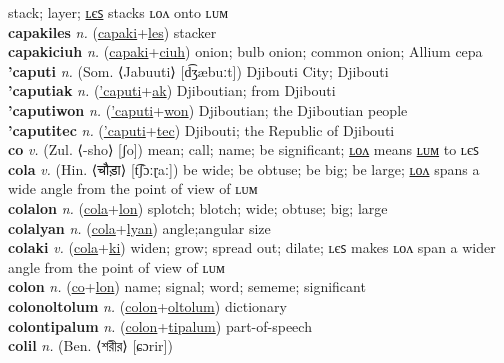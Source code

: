 stack; layer; \hyperref[capakiles]{ʟєꜱ} stacks ʟᴏᴧ onto ʟᴜᴍ \label{capaki} \\
\textbf{capakiles} \textit{n.} (\hyperref[capaki]{capaki}+\hyperref[les]{les})
stacker \label{capakiles} \\
\textbf{capakiciuh} \textit{n.} (\hyperref[capaki]{capaki}+\hyperref[ciuh]{ciuh})
onion; bulb onion; common onion; Allium cepa \label{capakiciuh} \\
\textbf{'caputi} \textit{n.} (Som. ⟨Jabuuti⟩ [d͡ʒæbuːt])
Djibouti City; Djibouti \label{'caputi} \\
\textbf{'caputiak} \textit{n.} (\hyperref['caputi]{'caputi}+\hyperref[ak]{ak})
Djiboutian; from Djibouti \label{'caputiak} \\
\textbf{'caputiwon} \textit{n.} (\hyperref['caputi]{'caputi}+\hyperref[won]{won})
Djiboutian; the Djiboutian people \label{'caputiwon} \\
\textbf{'caputitec} \textit{n.} (\hyperref['caputi]{'caputi}+\hyperref[tec]{tec})
Djibouti; the Republic of Djibouti \label{'caputitec} \\
\textbf{co} \textit{v.} (Zul. ⟨-sho⟩ [ʃo])
mean; call; name; be significant; \hyperref[colon]{ʟᴏᴧ} means \hyperref[colum]{ʟᴜᴍ} to ʟєꜱ \label{co} \\
\textbf{cola} \textit{v.} (Hin. ⟨चौड़ा⟩ [t͡ʃɔːɽaː])
be wide; be obtuse; be big; be large; \hyperref[colalon]{ʟᴏᴧ} spans a wide angle from the point of view of ʟᴜᴍ \label{cola} \\
\textbf{colalon} \textit{n.} (\hyperref[cola]{cola}+\hyperref[lon]{lon})
splotch; blotch; wide; obtuse; big; large \label{colalon} \\
\textbf{colalyan} \textit{n.} (\hyperref[cola]{cola}+\hyperref[lyan]{lyan})
angle;angular size \label{colalyan} \\
\textbf{colaki} \textit{v.} (\hyperref[cola]{cola}+\hyperref[ki]{ki})
widen; grow; spread out; dilate; ʟєꜱ makes ʟᴏᴧ span a wider angle from the point of view of ʟᴜᴍ \label{colaki} \\
\textbf{colon} \textit{n.} (\hyperref[co]{co}+\hyperref[lon]{lon})
name; signal; word; sememe; significant \label{colon} \\
\textbf{colonoltolum} \textit{n.} (\hyperref[colon]{colon}+\hyperref[oltolum]{oltolum})
dictionary \label{colonoltolum} \\
\textbf{colontipalum} \textit{n.} (\hyperref[colon]{colon}+\hyperref[tipalum]{tipalum})
part-of-speech \label{colontipalum} \\
\textbf{colil} \textit{n.} (Ben. ⟨শরীর⟩ [ɕɔrir])
